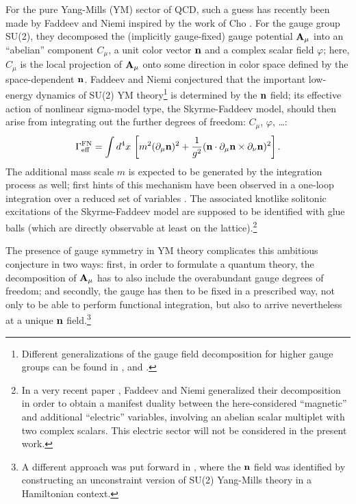 \documentclass[a4paper,12pt]{article}
\begin{document}
For the pure Yang-Mills (YM) sector of QCD, such a guess has recently
been made by Faddeev and Niemi \cite{Faddeev:1999eq} inspired by the
work of Cho \cite{Cho:1980nv}. For the gauge group SU(2), they
decomposed the (implicitly gauge-fixed) gauge potential
$\mathbf{A}_\mu$ into an ``abelian'' component $C_\mu$, a unit color vector
$\mathbf{n}$ and a complex scalar field $\varphi$; here, $C_\mu$ is the local
projection of $\mathbf{A}_\mu$ onto some direction in color space defined by
the space-dependent $\mathbf{n}$. Faddeev and Niemi conjectured that the
important low-energy dynamics of SU(2) YM theory\footnote{Different
  generalizations of the gauge field decomposition for higher gauge
  groups can be found in \cite{Periwal:1998pc}, \cite{Faddeev:1999yz}
  and \cite{Shabanov:1999xy}.} is determined by the
$\mathbf{n}$ field; its effective action of nonlinear sigma-model type,
the Skyrme-Faddeev model, should then arise from integrating out the
further degrees of freedom: $C_\mu$, $\varphi$, \dots:
\begin{equation}
\Gamma_{\text{eff}}^{\text{FN}}= \int d^4x\, \left[ m^2 (\partial_\mu \mathbf{n})^2 +
  \frac{1}{g^2} (\mathbf{n}\cdot
  \partial_\mu\mathbf{n}\times\partial_\nu\mathbf{n})^2\right]. \label{1}
\end{equation}
The additional mass scale $m$ is expected to be generated by the
integration process as well; first hints of this mechanism have been
observed in a one-loop integration over a reduced set of variables
\cite{Langmann:1999nn,Cho:1999wp}. The associated knotlike solitonic
excitations of the Skyrme-Faddeev model are supposed to be identified
with glue balls (which are directly observable at least on the
lattice).\footnote{In a very recent paper \cite{Faddeev:2001dd},
  Faddeev and Niemi generalized their decomposition in order to obtain
  a manifest duality between the here-considered ``magnetic'' and
  additional ``electric'' variables, involving an abelian scalar
  multiplet with two complex scalars. This electric sector will not be
  considered in the present work.}

The presence of gauge symmetry in YM theory complicates this ambitious
conjecture in two ways: first, in order to formulate a quantum theory,
the decomposition of $\mathbf{A}_\mu$ has to also include the overabundant
gauge degrees of freedom; and secondly, the gauge has then to be fixed
in a prescribed way, not only to be able to perform functional
integration, but also to arrive nevertheless at a unique $\mathbf{n}$
field.\footnote{A different approach was put forward in
  \cite{Khvedelidze:1999hm}, where the $\mathbf{n}$ field was identified by
  constructing an unconstraint version of SU(2) Yang-Mills theory in a
  Hamiltonian context.}
\end{document}
